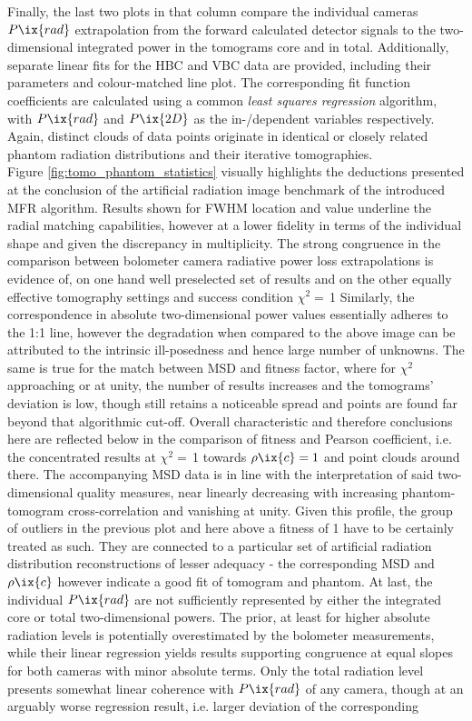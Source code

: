             Finally, the last two plots in that column compare the individual cameras $P\ix{rad}$ extrapolation from the forward calculated detector signals to the two-dimensional integrated power in the tomograms core and in total. Additionally, separate linear fits for the HBC and VBC data are provided, including their parameters and colour-matched line plot. The corresponding fit function coefficients are calculated using a common \textit{least squares regression} algorithm, with $P\ix{rad}$ and $P\ix{2D}$ as the in-/dependent variables respectively. Again, distinct clouds of data points originate in identical or closely related phantom radiation distributions and their iterative tomographies.\\%
            Figure \ref{fig:tomo_phantom_statistics} visually highlights the deductions presented at the conclusion of the artificial radiation image benchmark of the introduced MFR algorithm. Results shown for FWHM location and value underline the radial matching capabilities, however at a lower fidelity in terms of the individual shape and given the discrepancy in multiplicity. The strong congruence in the comparison between bolometer camera radiative power loss extrapolations is evidence of, on one hand well preselected set of results and on the other equally effective tomography settings and success condition $\chi^{2}=$\,\SI{1}{\arbitraryunit} Similarly, the correspondence in absolute two-dimensional power values essentially adheres to the 1:1 line, however the degradation when compared to the above image can be attributed to the intrinsic ill-posedness and hence large number of unknowns. The same is true for the match between MSD and fitness factor, where for $\chi^{2}$ approaching or at unity, the number of results increases and the tomograms' deviation is low, though still retains a noticeable spread and points are found far beyond that algorithmic cut-off. Overall characteristic and therefore conclusions here are reflected below in the comparison of fitness and Pearson coefficient, i.e. the concentrated results at $\chi^{2}=$\,\SI{1}{\arbitraryunit} towards $\rho\ix{c}=1$ and point clouds around there. The accompanying MSD data is in line with the interpretation of said two-dimensional quality measures, near linearly decreasing with increasing phantom-tomogram cross-correlation and vanishing at unity. Given this profile, the group of outliers in the previous plot and here above a fitness of \SI{1}{\arbitraryunit} have to be certainly treated as such. They are connected to a particular set of artificial radiation distribution reconstructions of lesser adequacy - the corresponding MSD and $\rho\ix{c}$ however indicate a good fit of tomogram and phantom. At last, the individual $P\ix{rad}$ are not sufficiently represented by either the integrated core or total two-dimensional powers. The prior, at least for higher absolute radiation levels is potentially overestimated by the bolometer measurements, while their linear regression yields results supporting congruence at equal slopes for both cameras with minor absolute terms. Only the total radiation level presents somewhat linear coherence with $P\ix{rad}$ of any camera, though at an arguably worse regression result, i.e. larger deviation of the corresponding 